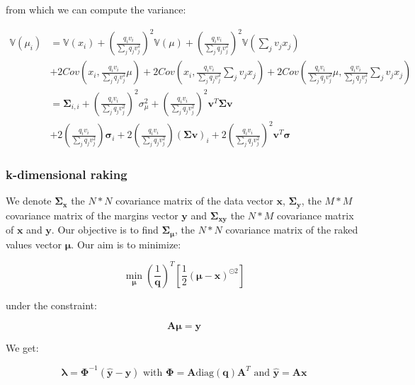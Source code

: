 \documentclass{tex/note}
\begin{document}
from which we can compute the variance:

\begin{align*}
\mathbb{V} \left( \mu_i \right) & = \mathbb{V} \left( x_i \right) + \left( \frac{q_i v_i}{\sum_j q_j v_j^2} \right) ^2 \mathbb{V} \left( \mu \right) + \left( \frac{q_i v_i}{\sum_j q_j v_j^2} \right) ^2 \mathbb{V} \left( \sum_j v_j x_j \right) \\
& + 2 Cov \left( x_i, \frac{q_i v_i}{\sum_j q_j v_j^2} \mu \right) + 2 Cov \left( x_i , \frac{q_i v_i}{\sum_j q_j v_j^2} \sum_j v_j x_j \right) + 2 Cov \left( \frac{q_i v_i}{\sum_j q_j v_j^2} \mu , \frac{q_i v_i}{\sum_j q_j v_j^2} \sum_j v_j x_j \right) \\
& = \bm{\Sigma}_{i,i} + \left( \frac{q_i v_i}{\sum_j q_j v_j^2} \right) ^2 \sigma_{\mu}^2 + \left( \frac{q_i v_i}{\sum_j q_j v_j^2} \right) ^2 \bm{v}^T \bm{\Sigma} \bm{v} \\
& + 2 \left( \frac{q_i v_i}{\sum_j q_j v_j^2} \right) \bm{\sigma}_i + 2 \left( \frac{q_i v_i}{\sum_j q_j v_j^2} \right) \left( \bm{\Sigma} \bm{v} \right) _i + 2 \left( \frac{q_i v_i}{\sum_j q_j v_j^2} \right) ^2 \bm{v}^T \bm{\sigma}
\end{align*}

\subsubsection{k-dimensional raking}

We denote $\bm{\Sigma}_{\bm{x}}$ the $N * N$ covariance matrix of the data vector $\bm{x}$, $\bm{\Sigma}_{\bm{y}}$, the $M * M$ covariance matrix of the margins vector $\bm{y}$ and $\bm{\Sigma}_{\bm{x} \bm{y}}$ the $N * M$ covariance matrix of $\bm{x}$ and $\bm{y}$. Our objective is to find $\bm{\Sigma}_{\bm{\mu}}$, the $N * N$ covariance matrix of the raked values vector $\bm{\mu}$. Our aim is to minimize:

\begin{equation*}
\min_{\bm{\mu}} \left( \frac{1}{\bm{q}} \right)^T \left[ \frac{1}{2} \left( \bm{\mu} - \bm{x} \right)^{\odot 2} \right]
\end{equation*}

under the constraint:

\begin{equation*}
\bm{A} \bm{\mu} = \bm{y}
\end{equation*}

We get:

\begin{equation*}
\bm{\lambda} = \bm{\Phi} ^{-1} \left( \hat{\bm{y}} - \bm{y} \right) \text{ with } \bm{\Phi} = \bm{A} \text{diag} \left( \bm{q} \right) \bm{A}^T  \text{ and } \hat{\bm{y}} = \bm{A} \bm{x}
\end{equation*}
\end{document}
